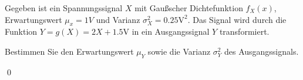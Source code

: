 \documentclass{abgabe}
\begin{document}
\begin{questions}
    \question
    Gegeben ist ein Spannungssignal $X$ mit Gaußscher Dichtefunktion $f_X(x)$, Erwartungswert $\mu_x = 1\si{V}$ und Varianz $\sigma_X^2 = 0.25\si{\volt}^2$. 
    Das Signal wird durch die Funktion $Y = g(X) = 2X + 1.5\si{\V}$ in ein Ausgangssignal $Y$ transformiert.
    
    Bestimmen Sie den Erwartungswert $\mu_Y$ sowie die Varianz $\sigma^2_Y$ des Ausgangssignals.
    \begin{solution}

        \qed
    \end{solution}
\end{questions}
\end{document}
